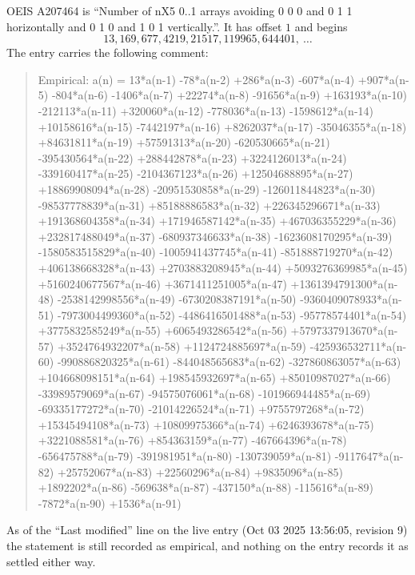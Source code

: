 \documentclass[11pt,a4paper]{article}
\theoremstyle{plain}
\theoremstyle{definition}
\begin{document}
OEIS A207464 is ``Number of nX5 0..1 arrays avoiding 0 0 0 and 0 1 1 horizontally and 0 1 0 and 1 0 1 vertically.''. It has offset
$1$ and begins
\[
13, 169, 677, 4219, 21517, 119965, 644401,\ \dots
\]
The entry carries the following comment:
\begin{quote}\small
Empirical: a(n) = 13*a(n-1) -78*a(n-2) +286*a(n-3) -607*a(n-4) +907*a(n-5) -804*a(n-6) -1406*a(n-7) +22274*a(n-8) -91656*a(n-9) +163193*a(n-10) -212113*a(n-11) +320060*a(n-12) -778036*a(n-13) -1598612*a(n-14) +10158616*a(n-15) -7442197*a(n-16) +8262037*a(n-17) -35046355*a(n-18) +84631811*a(n-19) +57591313*a(n-20) -620530665*a(n-21) -395430564*a(n-22) +288442878*a(n-23) +3224126013*a(n-24) -339160417*a(n-25) -2104367123*a(n-26) +12504688895*a(n-27) +18869908094*a(n-28) -20951530858*a(n-29) -126011844823*a(n-30) -98537778839*a(n-31) +85188886583*a(n-32) +226345296671*a(n-33) +191368604358*a(n-34) +171946587142*a(n-35) +467036355229*a(n-36) +232817488049*a(n-37) -680937346633*a(n-38) -1623608170295*a(n-39) -1580583515829*a(n-40) -1005941437745*a(n-41) -851888719270*a(n-42) +406138668328*a(n-43) +2703883208945*a(n-44) +5093276369985*a(n-45) +5160240677567*a(n-46) +3671411251005*a(n-47) +1361394791300*a(n-48) -2538142998556*a(n-49) -6730208387191*a(n-50) -9360409078933*a(n-51) -7973004499360*a(n-52) -4486416501488*a(n-53) -95778574401*a(n-54) +3775832585249*a(n-55) +6065493286542*a(n-56) +5797337913670*a(n-57) +3524764932207*a(n-58) +1124724885697*a(n-59) -425936532711*a(n-60) -990886820325*a(n-61) -844048565683*a(n-62) -327860863057*a(n-63) +104668098151*a(n-64) +198545932697*a(n-65) +85010987027*a(n-66) -33989579069*a(n-67) -94575076061*a(n-68) -101966944485*a(n-69) -69335177272*a(n-70) -21014226524*a(n-71) +9755797268*a(n-72) +15345494108*a(n-73) +10809975366*a(n-74) +6246393678*a(n-75) +3221088581*a(n-76) +854363159*a(n-77) -467664396*a(n-78) -656475788*a(n-79) -391981951*a(n-80) -130739059*a(n-81) -9117647*a(n-82) +25752067*a(n-83) +22560296*a(n-84) +9835096*a(n-85) +1892202*a(n-86) -569638*a(n-87) -437150*a(n-88) -115616*a(n-89) -7872*a(n-90) +1536*a(n-91)
\end{quote}
As of the ``Last modified'' line on the live entry (Oct 03 2025 13:56:05, revision
9) the statement is still recorded as empirical, and nothing on the entry
records it as settled either way.
\end{document}
